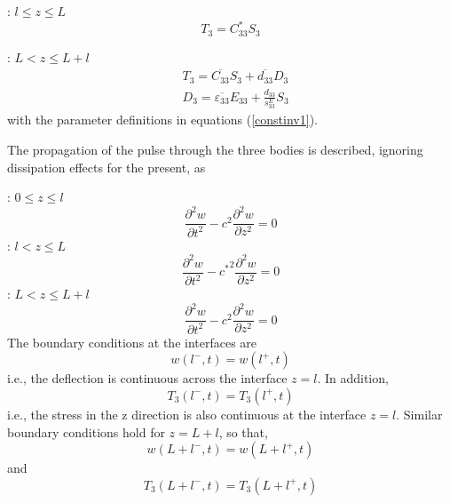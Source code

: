 \documentclass[11pt,letterpaper]{article}%
\begin{document}
: $l \leq z \leq L$
\begin{equation}
T_3 = C^\ast_{33}S_3 \label{constrod}
\end{equation}
%

: $L < z \leq L+l$
\begin{align}
&T_3 = \overline{C_{33}}S_3 + \overline{d_{33}}D_3 \nonumber\\
&D_3 = \overline{\varepsilon_{33}}E_{33} + \frac{d_{33}}{s^E_{33}}
S_3 \label{constitrec1}
\end{align}
with the parameter definitions in equations (\ref{constinv1}).

The propagation of the pulse through the three bodies is described,
ignoring dissipation effects for the present, as%

: $0 \leq z \leq l$
\begin{equation}
\frac{\partial^2w}{\partial t^2} - c^2\frac{\partial^2w}{\partial
z^2} = 0 \label{proptrans1}
\end{equation}
%
: $l < z \leq L$
\begin{equation}
\frac{\partial^2w}{\partial t^2} -
{c^\ast}^2\frac{\partial^2w}{\partial z^2} = 0 \label{proprod1}
\end{equation}
%
: $L < z \leq L+l$
\begin{equation}
\frac{\partial^2w}{\partial t^2} - c^2\frac{\partial^2w}{\partial
z^2} = 0 \label{proprec1}
\end{equation}
The boundary conditions at the interfaces are
\begin{equation}
w(l^{-},t) = w(l^{+},t) \label{bounddeftrans1}
\end{equation}
i.e., the deflection is continuous across the interface $z = l$.
In addition,
\begin{equation}
T_3(l^{-},t) = T_3(l^+,t) \label{boundstr1}
\end{equation}
i.e., the stress in the z direction is also continuous at the
interface $z = l$. Similar boundary conditions hold for $z = L+l$,
so that,
\begin{equation}
w(L+l^{-},t) = w(L+l^+,t) \label{bounddefrec2}
\end{equation}
and
\begin{equation}
T_3(L+l^{-},t) = T_3(L+l^+,t) \label{boundstr2}
\end{equation}
\end{document}
